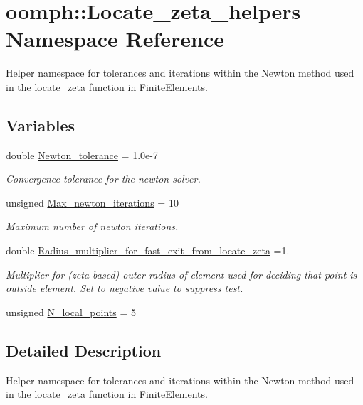 \hypertarget{namespaceoomph_1_1Locate__zeta__helpers}{}\section{oomph\+:\+:Locate\+\_\+zeta\+\_\+helpers Namespace Reference}
\label{namespaceoomph_1_1Locate__zeta__helpers}


Helper namespace for tolerances and iterations within the Newton method used in the locate\+\_\+zeta function in Finite\+Elements.  


\subsection*{Variables}
\begin{DoxyCompactItemize}
\item 
double \hyperlink{namespaceoomph_1_1Locate__zeta__helpers_ad78a9bb56905a77e0bb9486ba3fac6b3}{Newton\+\_\+tolerance} = 1.\+0e-\/7
\begin{DoxyCompactList}\small\item\em Convergence tolerance for the newton solver. \end{DoxyCompactList}\item 
unsigned \hyperlink{namespaceoomph_1_1Locate__zeta__helpers_a473b3aa4666ed6dfeb49bff0c6ed0e71}{Max\+\_\+newton\+\_\+iterations} = 10
\begin{DoxyCompactList}\small\item\em Maximum number of newton iterations. \end{DoxyCompactList}\item 
double \hyperlink{namespaceoomph_1_1Locate__zeta__helpers_add7a14717af82a04aea106aa76fa1a94}{Radius\+\_\+multiplier\+\_\+for\+\_\+fast\+\_\+exit\+\_\+from\+\_\+locate\+\_\+zeta} =1.
\begin{DoxyCompactList}\small\item\em Multiplier for (zeta-\/based) outer radius of element used for deciding that point is outside element. Set to negative value to suppress test. \end{DoxyCompactList}\item 
unsigned \hyperlink{namespaceoomph_1_1Locate__zeta__helpers_ad92daa85eb93813c72e1ec57cce15382}{N\+\_\+local\+\_\+points} = 5
\end{DoxyCompactItemize}


\subsection{Detailed Description}
Helper namespace for tolerances and iterations within the Newton method used in the locate\+\_\+zeta function in Finite\+Elements. 

